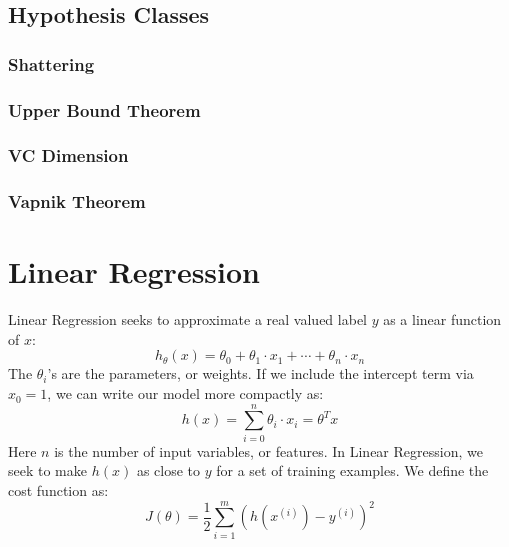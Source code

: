 \documentclass[twoside,twocolumn]{article}
\begin{document}
\subsection{Hypothesis Classes}
\subsubsection{Shattering}
\subsubsection{Upper Bound Theorem}
\subsubsection{VC Dimension}
\subsubsection{Vapnik Theorem}
\section{Linear Regression}
Linear Regression seeks to approximate a real valued label $y$ as a
linear function of $x$:
\begin{equation}
  h_{\theta}(x) = \theta_0 + \theta_1 \cdot x_1 + \cdots + \theta_n \cdot x_n
\end{equation}
The $\theta_i$'s are the parameters, or weights. If we include the
intercept term via $x_0=1$, we can write our model more compactly as:
\begin{equation}
  h(x) = \sum_{i=0}^{n} \theta_i \cdot x_i = \theta^T x
\end{equation}
Here $n$ is the number of input variables, or features. In Linear Regression,
we seek to make $h(x)$ as close to $y$ for a set of training examples. We
define the cost function as:
\begin{equation}
  J(\theta) = \frac{1}{2} \sum_{i=1}^{m} \left( h \left(x^{(i)}\right) - y^{(i)}\right)^2
\end{equation}
\end{document}
